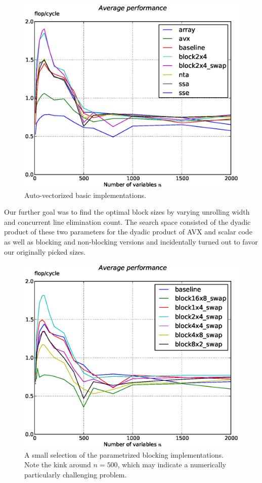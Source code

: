 \documentclass[letterpaper]{article}
\begin{document}
\begin{figure}\centering
  \includegraphics[scale=0.4]{img/results_basic_autovec.eps}
  \caption{Auto-vectorized basic implementations.\label{res_basic_autovec}}
\end{figure}


Our further goal was to find the optimal block sizes by varying unrolling width and concurrent line elimination count.
The search space consisted of the dyadic product of these two parameters for the dyadic product of AVX and scalar code
as well as blocking and non-blocking versions and incidentally turned out to favor our originally picked sizes.

\begin{figure}\centering
  \includegraphics[scale=0.4]{img/results_find_blocks.eps}
  \caption{A small selection of the parametrized blocking implementations. Note the kink around $n=500$, which may indicate a numerically particularly challenging problem.\label{res_findblock}}
\end{figure}
\end{document}
